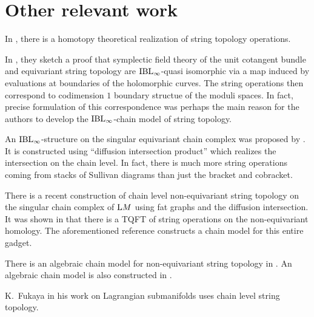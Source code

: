 \documentclass[\MainFolder/Text.tex]{subfiles}
\begin{document}
\section{Other relevant work}

In \cite{Cohen2001}, there is a homotopy theoretical realization of string topology operations.

In \cite{Cieliebak2007}, they sketch a proof that symplectic field theory of the unit cotangent bundle and equivariant string topology are $\mathrm{IBL}_\infty$-quasi isomorphic via a map induced by evaluations at boundaries of the holomorphic curves. The string operations then correspond to codimension $1$ boundary structue of the moduli spaces. In fact, precise formulation of this correspondence was perhaps the main reason for the authors to develop the $\mathrm{IBL}_\infty$-chain model of string topology.

An $\mathrm{IBL}_\infty$-structure on the singular equivariant chain complex was proposed by \cite{Sullivan2005}. It is constructed using ``diffusion intersection product'' which realizes the intersection on the chain level. In fact, there is much more string operations coming from stacks of Sullivan diagrams than just the bracket and cobracket.

There is a recent construction of chain level non-equivariant string topology on the singular chain complex of $\mathrm{L} M$ using fat graphs \cite{Drummond-Cole2015} and the diffusion intersection. It was shown in \cite{Cohen2006} that there is a TQFT of string operations on the non-equivariant homology. The aforementioned reference constructs a chain model for this entire gadget. 

There is an algebraic chain model for non-equivariant string topology in \cite{Chen2012}. An algebraic chain model is also constructed in \cite{Irie2014}. 

K.~Fukaya in his work on Lagrangian submanifolds uses chain level string topology.

%
%
\end{document}
